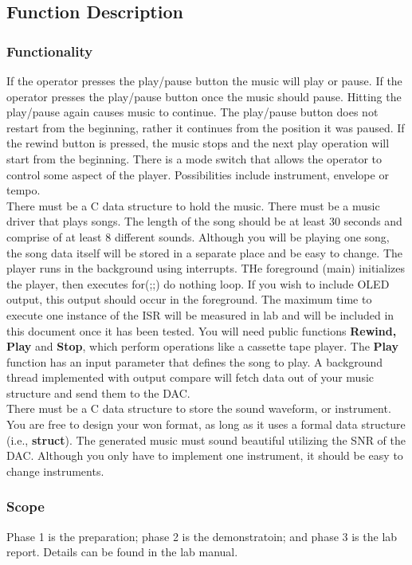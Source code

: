 \documentclass{article}
\begin{document}
	\subsection{Function Description}

		\subsubsection{Functionality}
			If the operator presses the play/pause button the music will play or pause. If the operator presses the play/pause button once the music should pause. Hitting the play/pause again causes music to continue. The play/pause button does not restart from the beginning, rather it continues from the position it was paused. If the rewind button is pressed, the music stops and the next play operation will start from the beginning. There is a mode switch that allows the operator to control some aspect of the player. Possibilities include instrument, envelope or tempo.\\
			There must be a C data structure to hold the music. There must be a music driver that plays songs. The length of the song should be at least 30 seconds and comprise of at least 8 different sounds. Although you will be playing one song, the song data itself will be stored in a separate place and be easy to change. The player runs in the background using interrupts. THe foreground (main) initializes the player, then executes for(;;){} do nothing loop. If you wish to include OLED output, this output should occur in the foreground. The maximum time to execute one instance of the ISR will be measured in lab and will be included in this document once it has been tested. You will need public functions \textbf{Rewind, Play} and \textbf{Stop}, which perform operations like a cassette tape player. The \textbf{Play} function has an input parameter that defines the song to play. A background thread implemented with output compare will fetch data out of your music structure and send them to the DAC.\\
			There must be a C data structure to store the sound waveform, or instrument. You are free to design your won format, as long as it uses a formal data structure (i.e., \textbf{struct}). The generated music must sound beautiful utilizing the SNR of the DAC. Although you only have to implement one instrument, it should be easy to change instruments.
		\subsubsection{Scope}
			Phase 1 is the preparation; phase 2 is the demonstratoin; and phase 3 is the lab report. Details can be found in the lab manual.
\end{document}
